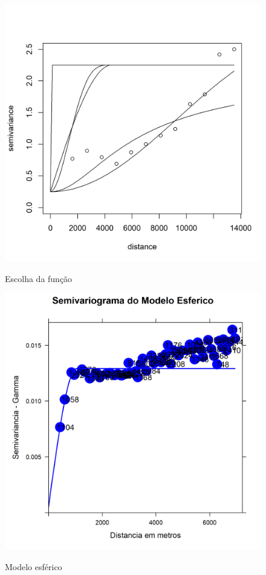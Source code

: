 			\begin{minipage}[t!]{0.31\textwidth}
				
				\begin{figure}[H]
					\centering \small \caption{Escolha da função }
					\includegraphics[width=0.97\linewidth]{FIGURAS/variogramageor4}
					\label{fig:varexpfitsp}
				\end{figure}			
				
			\end{minipage} 
			\begin{minipage}[t!]{0.31\textwidth}
				
				\begin{figure}[H]
					\centering \small \caption{Modelo esférico}
					\includegraphics[width=0.97\linewidth]{FIGURAS/modelos-esferico}
					\label{fig:xvalid.cruzadaesferica2}
				\end{figure}		
			\end{minipage} 
			

